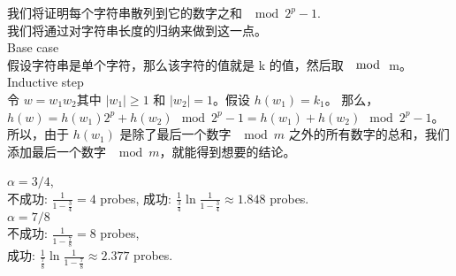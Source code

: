 \documentclass[a4paper, justified]{tufte-handout}
\begin{document}
\begin{problem}[TC 11.3-3]
\end{problem}

\begin{solution}
  我们将证明每个字符串散列到它的数字之和 $\mod 2^p - 1$.\\
  我们将通过对字符串长度的归纳来做到这一点。\\
  Base case\\
  假设字符串是单个字符，那么该字符的值就是 k 的值，然后取 $\mod$ m。\\
  Inductive step\\
  令 $w = w_1w_2$​ 其中 $|w_1| \ge 1$ 和 $|w_2| = 1$。假设 $h(w_1) = k_1$​。 那么，$h(w) = h(w_1)2^p + h(w_2) \mod 2^p − 1 = h(w_1) + h(w_2) \mod 2^p − 1$。所以，由于 $ h(w_1)$ 是除了最后一个数字 $\mod m$ 之外的所有数字的总和，我们添加最后一个数字 $\mod m$，就能得到想要的结论。
\end{solution}

\begin{problem}[TC 11.4-3]
\end{problem}

\begin{solution}
  $\alpha =3/4$,\\
  不成功: $\frac{1}{1 - \frac{3}{4}} = 4$ probes,
  成功: $\frac{1}{\frac{3}{4}} \ln\frac{1}{1-\frac{3}{4}} \approx 1.848$ probes.\\
  $\alpha = 7 / 8$\\
  不成功: $\frac{1}{1 - \frac{7}{8}} = 8 $ probes,\\
  成功: $\frac{1}{\frac{7}{8}} \ln\frac{1}{1 - \frac{7}{8}} \approx 2.377$ probes.\\
\end{solution}

\begin{problem}[TC Problem 11-1]
\end{problem}
\end{document}
